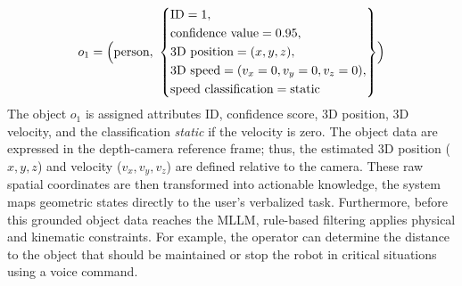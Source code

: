 \documentclass[lettersize,journal]{IEEEtran}
\begin{document}
\begin{equation}
	\begin{aligned}
		o_1 = \Bigl(\text{person},\ 
		\left\{
		\begin{aligned}
			& \text{ID} = 1, \\
			& \text{confidence value} = 0.95, \\
			& \text{3D position} = (x, y, z), \\
			& \text{3D speed} = (v_x = 0, v_y = 0, v_z = 0), \\
			& \text{speed classification} = \text{static}
		\end{aligned}
		\right\}
		\Bigr)
	\end{aligned}
	\label{eq:o1}
\end{equation}
The object $o_1$ is assigned  attributes ID, confidence score, 3D position, 3D velocity, and the classification \textit{static} if the velocity is zero. The object data are expressed in the depth-camera reference frame; thus, the estimated 3D position ($x,y,z$) and velocity ($v_x,v_y,v_z$) are defined relative to the camera.
These raw spatial coordinates are then transformed into actionable knowledge, the system maps geometric states directly to the user's verbalized task. Furthermore, before this grounded object data reaches the MLLM, rule-based filtering applies physical and kinematic constraints. For example, the operator can determine the distance to the object that should be maintained or stop the robot in critical situations using a voice command.
\end{document}
